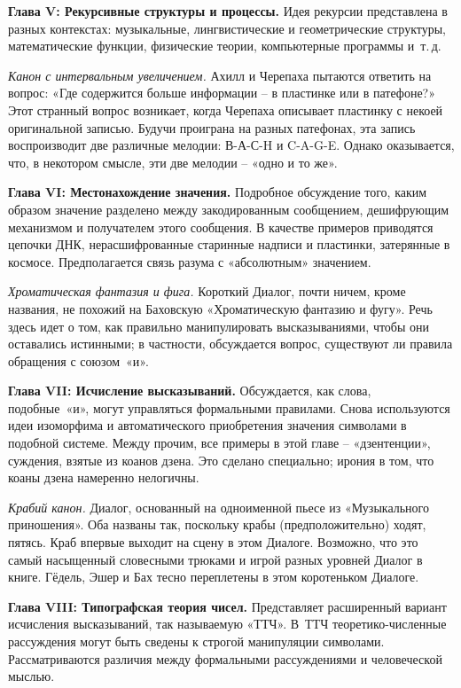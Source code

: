 \documentclass[../main.tex]{subfiles}
\begin{document}
\textbf{Глава V: Рекурсивные структуры и процессы.}
Идея рекурсии представлена в разных контекстах: музыкальные, лингвистические и геометрические структуры, математические функции, физические теории, компьютерные программы и~т.\,д.

\emph{Канон с интервальным увеличением.}
Ахилл и Черепаха пытаются ответить на вопрос: «Где содержится больше информации \--- в пластинке или в патефоне?» Этот странный вопрос возникает, когда Черепаха описывает пластинку с некоей оригинальной записью. Будучи проиграна на разных патефонах, эта запись воспроизводит две различные мелодии: В-А-С-H и C-A-G-E. Однако оказывается, что, в некотором смысле, эти две мелодии \--- «одно и то же».

\textbf{Глава VI: Местонахождение значения.}
Подробное обсуждение того, каким образом значение разделено между закодированным сообщением, дешифрующим механизмом и получателем этого сообщения. В качестве примеров приводятся цепочки ДНК, нерасшифрованные старинные надписи и пластинки, затерянные в космосе. Предполагается связь разума с «абсолютным» значением.

\emph{Хроматическая фантазия и фига.}
Короткий Диалог, почти ничем, кроме названия, не похожий на Баховскую «Хроматическую фантазию и фугу». Речь здесь идет о том, как правильно манипулировать высказываниями, чтобы они оставались истинными; в частности, обсуждается вопрос, существуют ли правила обращения с союзом~«и».

\textbf{Глава VII: Исчисление высказываний.}
Обсуждается, как слова, подобные~«и», могут управляться формальными правилами. Снова используются идеи изоморфима и автоматического приобретения значения символами в подобной системе. Между прочим, все примеры в этой главе \--- «дзентенции», суждения, взятые из коанов дзена. Это сделано специально; ирония в том, что коаны дзена намеренно нелогичны.

\emph{Крабий канон.}
Диалог, основанный на одноименной пьесе из «Музыкального приношения». Оба названы так, поскольку крабы (предположительно) ходят, пятясь. Краб впервые выходит на сцену в этом Диалоге. Возможно, что это самый насыщенный словесными трюками и игрой разных уровней Диалог в книге. Гёдель, Эшер и Бах тесно переплетены в этом коротеньком Диалоге.

\textbf{Глава VIII: Типографская теория чисел.}
Представляет расширенный вариант исчисления высказываний, так называемую «ТТЧ»\@. В~ТТЧ теоретико-численные рассуждения могут быть сведены к строгой манипуляции символами. Рассматриваются различия между формальными рассуждениями и человеческой мыслью.
\end{document}
